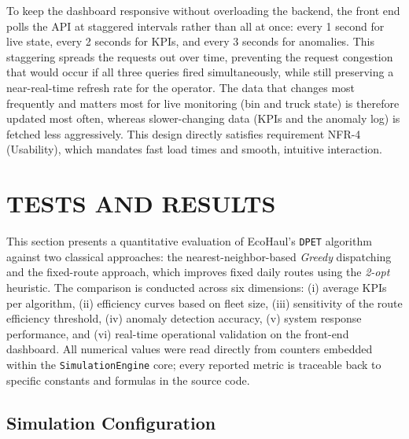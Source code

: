 \documentclass[12pt,a4paper]{report}
\begin{document}
\indent To keep the dashboard responsive without overloading the backend, the front end polls the API at staggered intervals rather than all at once: every 1 second for live state, every 2 seconds for KPIs, and every 3 seconds for anomalies. This staggering spreads the requests out over time, preventing the request congestion that would occur if all three queries fired simultaneously, while still preserving a near-real-time refresh rate for the operator. The data that changes most frequently and matters most for live monitoring (bin and truck state) is therefore updated most often, whereas slower-changing data (KPIs and the anomaly log) is fetched less aggressively. This design directly satisfies requirement NFR-4 (Usability), which mandates fast load times and smooth, intuitive interaction.

%

\chapter{TESTS AND RESULTS}
\label{chap:test}

\indent This section presents a quantitative evaluation of EcoHaul’s \texttt{DPET} algorithm against two classical approaches: the nearest-neighbor-based \textit{Greedy} dispatching and the fixed-route approach, which improves fixed daily routes using the \textit{2-opt} heuristic. The comparison is conducted across six dimensions: (i) average KPIs per algorithm, (ii) efficiency curves based on fleet size, (iii) sensitivity of the route efficiency threshold, (iv) anomaly detection accuracy, (v) system response performance, and (vi) real-time operational validation on the front-end dashboard. All numerical values were read directly from counters embedded within the \texttt{SimulationEngine} core; every reported metric is traceable back to specific constants and formulas in the source code.

\section{Simulation Configuration}
\label{sec:test_sim_config}
\end{document}
